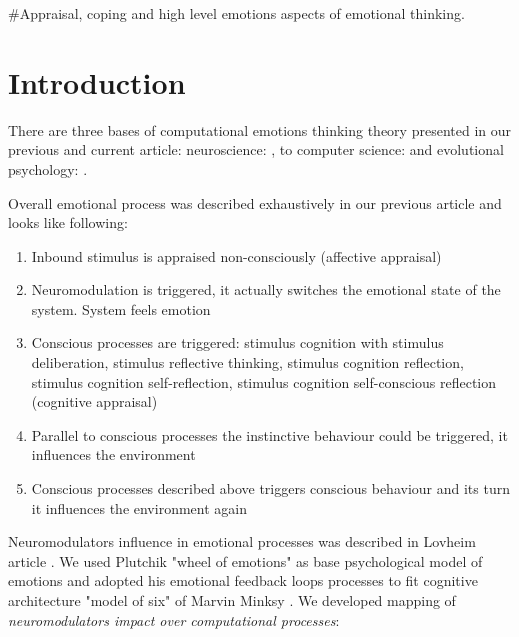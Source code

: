 #Appraisal, coping and high level emotions aspects of emotional thinking.

\section{Introduction}

There are three bases of computational emotions thinking theory presented in our previous\cite{computational_emotional_thinking} and current article: neuroscience: \cite{emotionsbraintorobot, parsingreward, neuromodulatory, cubeofemotions, natureofemotions}, to computer science: \cite{emotionandsociable, senticcomputing, hourglass, affectivemodelofinterplay, affectivecomputing, computationalmodelsemotion, computationalmodelsemotionscognition, evaluatingcomutationalmodel, threelevel} and evolutional psychology: \cite{natureofemotions, primer_affect_psychology, tomkins1, tomkins2, tomkins3, tomkins4}.

Overall emotional process was described exhaustively in our previous article \cite{computational_emotional_thinking} and looks like following:

\begin{enumerate}
\item  Inbound stimulus is appraised non-consciously (affective appraisal)
\item  Neuromodulation is triggered, it actually switches the emotional state of the system. System feels emotion
\item  Conscious processes are triggered: stimulus cognition with stimulus deliberation, stimulus reflective thinking, stimulus cognition reflection, stimulus cognition self-reflection, stimulus cognition self-conscious reflection (cognitive appraisal)
\item  Parallel to conscious processes the instinctive behaviour could be triggered, it influences the environment
\item  Conscious processes described above triggers conscious behaviour and its turn it influences the environment again
\end{enumerate}

Neuromodulators influence in emotional processes was described in Lovheim article \cite{cubeofemotions}. We used Plutchik "wheel of emotions" as base psychological model of emotions \cite{natureofemotions} and adopted his emotional feedback loops processes to fit cognitive architecture "model of six" of Marvin Minksy \cite{emotionmachine}. We developed mapping of \emph{neuromodulators impact over computational processes}:

